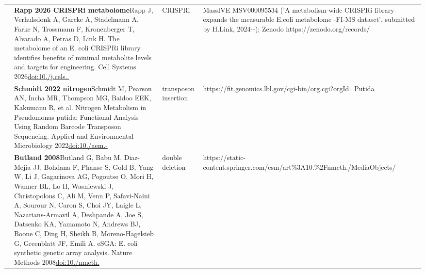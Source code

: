 \begin{landscape}
\begin{longtable}{@{}r@{\hspace{4pt}} L{86mm} L{74mm} L{78mm}@{}}
 & \textbf{Rapp 2026 CRISPRi metabolome}\newline Rapp J, Verhulsdonk A, Garcke A, Stadelmann A, Farke N, Trossmann F, Kronenberger T, Alvarado A, Petras D, Link H. The metabolome of an E. coli CRISPRi library identifies benefits of minimal metabolite levels and targets for engineering. Cell Systems 2026\newline \href{https://doi.org/10.1016/j.cels.2025.101518}{doi:10./\allowbreak j.\allowbreak cels..} & CRISPRi & MassIVE MSV000095534 ('A metabolism-\allowbreak wide CRISPRi library expands the measurable E.\allowbreak  coli metabolome -\allowbreak  FI-\allowbreak MS dataset', submitted by H.\allowbreak  Link, 2024--); Zenodo https:/\allowbreak /\allowbreak zenodo.\allowbreak org/\allowbreak records/ \\
 & \textbf{Schmidt 2022 nitrogen}\newline Schmidt M, Pearson AN, Incha MR, Thompson MG, Baidoo EEK, Kakumanu R, et al. Nitrogen Metabolism in Pseudomonas putida: Functional Analysis Using Random Barcode Transposon Sequencing. Applied and Environmental Microbiology 2022\newline \href{https://doi.org/10.1128/aem.02430-21}{doi:10./\allowbreak aem.-} & transposon insertion & https:/\allowbreak /\allowbreak fit.\allowbreak genomics.\allowbreak lbl.\allowbreak gov/\allowbreak cgi-\allowbreak bin/\allowbreak org.\allowbreak cgi?orgId=Putida \\
 & \textbf{Butland 2008}\newline Butland G, Babu M, Diaz-Mejia JJ, Bohdana F, Phanse S, Gold B, Yang W, Li J, Gagarinova AG, Pogoutse O, Mori H, Wanner BL, Lo H, Wasniewski J, Christopolous C, Ali M, Venn P, Safavi-Naini A, Sourour N, Caron S, Choi JY, Laigle L, Nazarians-Armavil A, Deshpande A, Joe S, Datsenko KA, Yamamoto N, Andrews BJ, Boone C, Ding H, Sheikh B, Moreno-Hagelsieb G, Greenblatt JF, Emili A. eSGA: E. coli synthetic genetic array analysis. Nature Methods 2008\newline \href{https://doi.org/10.1038/nmeth.1239}{doi:10./\allowbreak nmeth.} & double deletion & https:/\allowbreak /\allowbreak static-\allowbreak content.\allowbreak springer.\allowbreak com/\allowbreak esm/\allowbreak art\%3A10.\%2Fnmeth./\allowbreak MediaObjects/\allowbreak  \\

\end{longtable}
\end{landscape}
